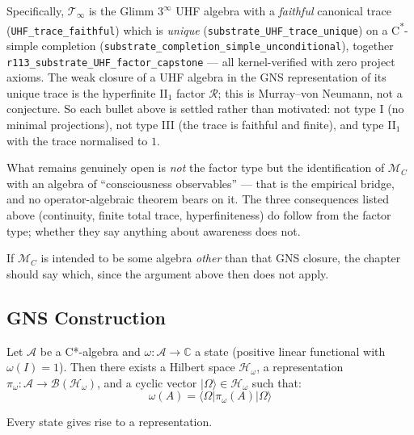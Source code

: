 \begin{level3}
Specifically, $\mathcal{T}_\infty$ is the Glimm $3^\infty$ UHF algebra with a
\emph{faithful} canonical trace (\texttt{UHF\_trace\_faithful}) which is
\emph{unique} (\texttt{substrate\_UHF\_trace\_unique}) on a C\textsuperscript{*}-simple
completion (\texttt{substrate\_completion\_simple\_unconditional}), together
\texttt{r113\_substrate\_UHF\_factor\_capstone} --- all kernel-verified with zero
project axioms. The weak closure of a UHF algebra in the GNS representation of
its unique trace is the hyperfinite II$_1$ factor $\mathcal{R}$; this is
Murray--von Neumann, not a conjecture. So each bullet above is settled rather than
motivated: not type I (no minimal projections), not type III (the trace is
faithful and finite), and type II$_1$ with the trace normalised to $1$.

What remains genuinely open is \emph{not} the factor type but the identification
of $\mathcal{M}_C$ with an algebra of ``consciousness observables'' --- that is
the empirical bridge, and no operator-algebraic theorem bears on it. The three
consequences listed above (continuity, finite total trace, hyperfiniteness) do
follow from the factor type; whether they say anything about awareness does not.

If $\mathcal{M}_C$ is intended to be some algebra \emph{other} than that GNS
closure, the chapter should say which, since the argument above then does not
apply.
\end{level3}

\subsection{GNS Construction}

\begin{theorem}\label{thm:gns}
Let $\mathcal{A}$ be a C*-algebra and $\omega: \mathcal{A} \to \mathbb{C}$ a state (positive linear functional with $\omega(I) = 1$). Then there exists a Hilbert space $\mathcal{H}_\omega$, a representation $\pi_\omega: \mathcal{A} \to \mathcal{B}(\mathcal{H}_\omega)$, and a cyclic vector $|\Omega\rangle \in \mathcal{H}_\omega$ such that:
\begin{equation}
\omega(A) = \langle \Omega | \pi_\omega(A) | \Omega \rangle
\end{equation}

Every state gives rise to a representation.
\end{theorem}

